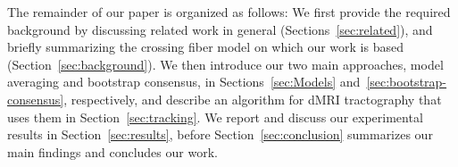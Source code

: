 


The remainder of our paper is organized as follows: We first provide the required background by discussing related work in general (Sections~\ref{sec:related}), and briefly summarizing the crossing fiber model on which our work is based (Section~\ref{sec:background}). We then introduce our two main approaches, model averaging and bootstrap consensus, in Sections~\ref{sec:Models} and~\ref{sec:bootstrap-consensus}, respectively, and describe an algorithm for dMRI tractography that uses them in  Section~\ref{sec:tracking}. We report and discuss our experimental results in Section~\ref{sec:results}, before Section~\ref{sec:conclusion} summarizes our main findings and concludes our work.

